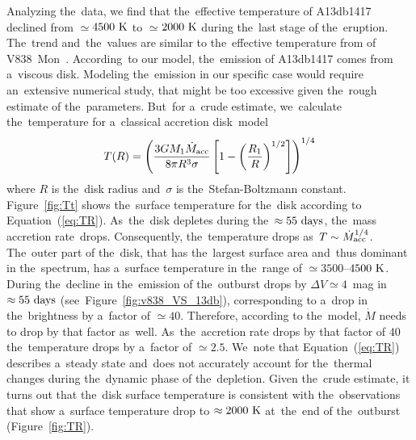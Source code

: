 \documentclass[galaxies,article,accept,moreauthors,pdftex]{mdpi}
\def \K{~\rm{K}}
\def \days{~\rm{days}}
\begin{document}
Analyzing the~data, we find that the~effective temperature of A13db1417 declined from $\simeq$$4500\K$ to $\simeq$$2000\K$ during the~last stage of the~eruption. The~trend and~the~values are similar to the~effective temperature from of V838~Mon~\citep{Tylenda2005}. According~to our model, the~emission of A13db1417 comes from a~viscous disk. Modeling the~emission in our specific case would require an~extensive numerical study, that might be too excessive given the~rough estimate of the~parameters. But~for a~crude estimate, we~calculate the~temperature for a~classical accretion disk~model
\begin{equation}
T(R)=\left( \frac{3 G M_1 \dot{M}_{\rm acc} }{8 \pi R^3 \sigma} \left[1-\left(\frac{R_1}{R}\right)^{1/2}\right] \right)^{1/4}
\label{eq:TR}
\end{equation}
where $R$ is the~disk radius and~$\sigma$ is the~Stefan-Boltzmann constant. Figure~\ref{fig:Tt} shows the~surface temperature for the~disk according to Equation~(\ref{eq:TR}). As~the~disk depletes during \vspace{2pt} the~$\approx 55 \days$, the~mass accretion rate~drops. Consequently, the~temperature drops as~$T \sim \dot{M}_{\rm acc}^{1/4}$.
The~outer part of the~disk, that has the~largest surface area and~thus dominant in the~spectrum, has a~surface temperature in the~range of $\simeq3500$--$4500\K$. During the~decline in the~emission of the~outburst drops by $\Delta V \simeq 4$~mag in $\approx 55 \days$ (see~Figure~\ref{fig:v838_VS_13db}), corresponding to a~drop in the~brightness by a~factor of $\simeq40$. Therefore, according to the~model, $\dot{M}$ needs to drop by that factor as~well. As~the~accretion rate drops by that factor of 40 the~temperature drops by a~factor of $\simeq2.5$. We~note that Equation~(\ref{eq:TR}) describes a~steady state and~does not accurately account for the~thermal changes during the~dynamic phase of the~depletion. Given the~crude estimate, it turns out that the~disk surface temperature is consistent with the~observations that show a~surface temperature drop to $\approx2000\K$ at~the~end of the~outburst (Figure~\ref{fig:TR}).
\end{document}
